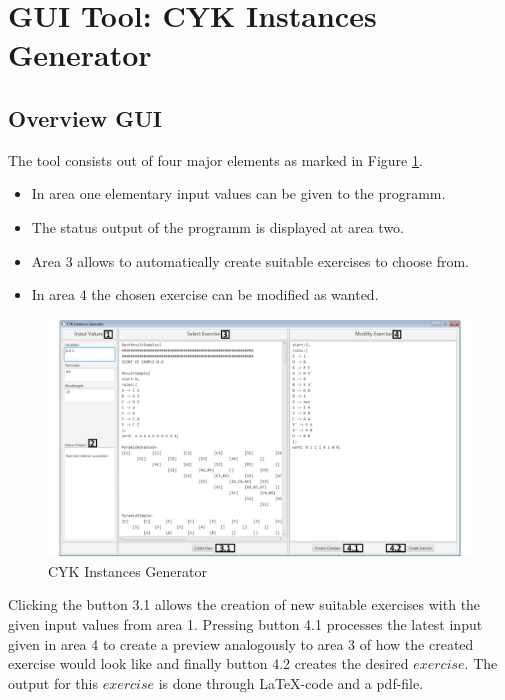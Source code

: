 
\section{GUI Tool: CYK Instances Generator }

\subsection{Overview GUI}
The tool consists out of four major elements as marked in Figure \ref{CYKInstancesGenerator}.
\begin{itemize}
	\item In area one elementary input values can be given to the programm.
	\item The status output of the programm is displayed at area two.
	\item Area 3 allows to automatically create suitable exercises to choose from.
	\item In area 4 the chosen exercise can be modified as wanted.
\end{itemize}
\begin{figure} [h]
	\centering
	\includegraphics[width=\textwidth]{abb/CYKInstancesGenerator.pdf}
	\caption{CYK Instances Generator}
	\label{CYKInstancesGenerator}
\end{figure}
Clicking the button 3.1 allows the creation of new suitable exercises with the given input values from area 1. Pressing button 4.1 processes the latest input given in area 4 to create a preview analogously to area 3 of how the created exercise would look like and finally button 4.2 creates the desired $exercise$. The output for this $exercise$ is done through \LaTeX-code and a pdf-file.
\pagebreak
